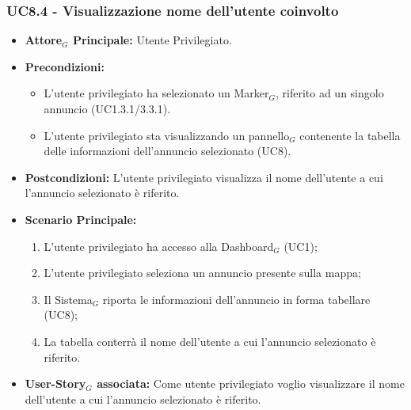 \documentclass[10pt]{article}
\begin{document}
\begin{justify}
 \subsubsection{\textbf{UC8.4 - Visualizzazione nome dell'utente coinvolto}}
 \begin{itemize}
     \item \textbf{Attore$_G$ Principale:} Utente Privilegiato.
     \item \textbf{Precondizioni:}
       \begin{itemize}
    	        \item L'utente privilegiato ha selezionato un Marker$_G$, riferito ad un singolo annuncio (UC1.3.1/3.3.1).
          \item L'utente privilegiato sta visualizzando un pannello$_G$ contenente la tabella delle informazioni dell'annuncio selezionato (UC8).
       \end{itemize}
     \item \textbf{Postcondizioni:} L'utente privilegiato visualizza il nome dell'utente a cui l'annuncio selezionato è riferito.
     \item \textbf{Scenario Principale:}
        \begin{enumerate}
            \item L'utente privilegiato ha accesso alla Dashboard$_G$ (UC1);
            \item L'utente privilegiato seleziona un annuncio presente sulla mappa;
            \item Il Sistema$_G$ riporta le informazioni dell'annuncio in forma tabellare (UC8);
            \item La tabella conterrà il nome dell'utente a cui l'annuncio selezionato è riferito.
        \end{enumerate}
     \item \textbf{User-Story$_G$ associata:} Come utente privilegiato voglio visualizzare il nome dell'utente a cui l'annuncio selezionato è riferito. 
 \end{itemize}

\end{justify}
\end{document}
